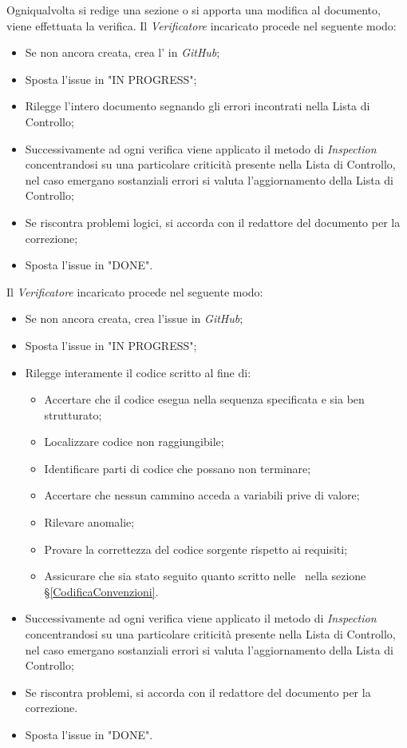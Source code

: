 \label{VerificaDocumentazione}
Ogniqualvolta si redige una sezione o si apporta una modifica al documento, viene effettuata la verifica.
Il \textit{Verificatore} incaricato procede nel seguente modo:
\begin{itemize}
	\item Se non ancora creata, crea l' in \textit{GitHub};
	\item Sposta l'issue in "IN PROGRESS";
	\item Rilegge l'intero documento segnando gli errori incontrati nella Lista di Controllo;
	\item Successivamente ad ogni verifica viene applicato il metodo di \textit{Inspection} concentrandosi su una particolare criticità presente nella Lista di Controllo, nel caso emergano sostanziali errori si valuta l'aggiornamento della Lista di Controllo;
	\item Se riscontra problemi logici, si accorda con il redattore del documento per la correzione;
	\item Sposta l'issue in "DONE".
\end{itemize}

\label{VerificaCodice}
Il \textit{Verificatore} incaricato procede nel seguente modo:
\begin{itemize}
	\item Se non ancora creata, crea l'issue in \textit{GitHub};
	\item Sposta l'issue in "IN PROGRESS";
	\item Rilegge interamente il codice scritto al fine di:
	\begin{itemize}
		\item Accertare che il codice esegua nella sequenza specificata e sia ben strutturato;
		\item Localizzare codice non raggiungibile;
		\item Identificare parti di codice che possano non terminare;
		\item Accertare che nessun cammino acceda a variabili prive di valore;
		\item Rilevare anomalie;
		\item Provare la correttezza del codice sorgente rispetto ai requisiti;
		\item Assicurare che sia stato seguito quanto scritto nelle \ nella sezione \S\ref{CodificaConvenzioni}.
	\end{itemize}
	\item Successivamente ad ogni verifica viene applicato il metodo di \textit{Inspection} concentrandosi su una particolare criticità presente nella Lista di Controllo, nel caso emergano sostanziali errori si valuta l'aggiornamento della Lista di Controllo;
	\item Se riscontra problemi, si accorda con il redattore del documento per la correzione. 
	\item Sposta l'issue in "DONE".
\end{itemize}

